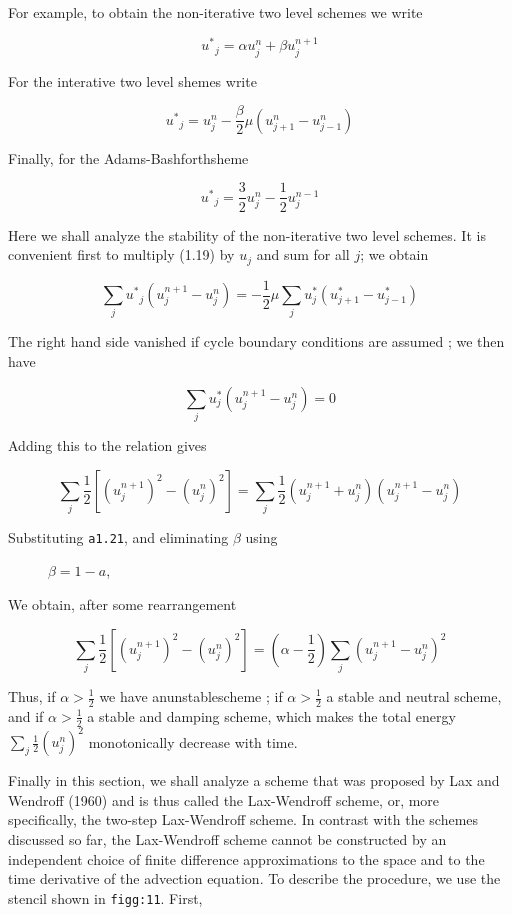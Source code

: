 For example, to obtain the non-iterative two level schemes we write

 {\[{u^{*}}_{j} = \alpha u_{j}^{n} + \beta u_{j}^{n + 1}\]}

For the interative two level shemes write

 {\[{u^{*}}_{j} = u_{j}^{n} - \frac{\beta}{2}\mu\left( u_{j + 1}^{n} - u_{j - 1}^{n} \right)\]}

Finally, for the Adams-Bashforthsheme

 {\[{u^{*}}_{j} = \frac{3}{2}u_{j}^{n} - \frac{1}{2}u_{j}^{n - 1}\]}

Here we shall analyze the stability of the non-iterative two level
schemes. It is convenient first to multiply (1.19) by \(u_{j}\) and sum
for all \(j\); we obtain

\[\sum_{j}{u^{*}}_{j}\left( u_{j}^{n + 1} - u_{j}^{n} \right) = - \frac{1}{2}\mu\sum_{j}u^{*}_{j}\left( u^{*}_{j+1} - u^{*}_{j - 1} \right)\]

The right hand side vanished if cycle boundary conditions are assumed ;
we then have

\[\sum_{j}u^{*}_{j}\left( u_{j}^{n + 1} - u_{j}^{n} \right) = 0\]

Adding this to the relation gives

\[\sum_{j}\frac{1}{2}\left\lbrack \left( u_{j}^{n + 1} \right)^{2} - \left( u_{j}^{n} \right)^{2} \right\rbrack = \sum_{j}\frac{1}{2}\left( u_{j}^{n + 1} + u_{j}^{n} \right)\left( u_{j}^{n + 1} - u_{j}^{n} \right)\]

\begin{description}
 \item[Substituting \texttt{a1.21}, and eliminating \(\beta\) using]
 \(\beta = 1 - a\),
\end{description}

We obtain, after some rearrangement

 {\[\sum_{j}\frac{1}{2}\left\lbrack
\left( u_{j}^{n + 1} \right)^{2} - \left( u_{j}^{n} \right)^{2} \right\rbrack
= \left( \alpha - \frac{1}{2} \right)\sum_{j}\left( u_{j}^{n + 1} - u_{j}^{n} \right)^{2}\]}

Thus, if \(\alpha > \frac{1}{2}\) we have anunstablescheme ; if
\(\alpha > \frac{1}{2}\) a stable and neutral scheme, and if
\(\alpha > \frac{1}{2}\) a stable and damping scheme, which makes the
total energy \(\sum_{j}\frac{1}{2}\left( u_{j}^{n} \right)^{2}\)
monotonically decrease with time.

Finally in this section, we shall analyze a scheme that was proposed by
Lax and Wendroff (1960) and is thus called the Lax-Wendroff scheme, or,
more specifically, the two-step Lax-Wendroff scheme. In contrast with
the schemes discussed so far, the Lax-Wendroff scheme cannot be
constructed by an independent choice of finite difference approximations
to the space and to the time derivative of the advection equation. To
describe the procedure, we use the stencil shown in \texttt{figg:11}.
First,

